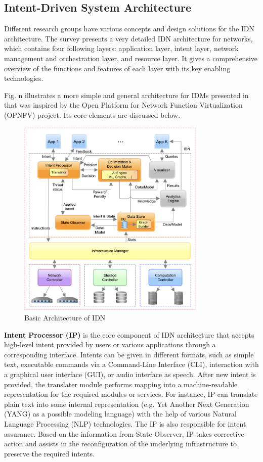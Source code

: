\subsection{Intent-Driven System Architecture}

Different research groups have various concepts and design solutions for the IDN architecture. The survey \cite[13]{Mehmood2021} presents a very detailed IDN architecture for networks, which contains four following layers: application layer, intent layer, network management and orchestration layer, and resource layer. It gives a comprehensive overview of the functions and features of each layer with its key enabling technologies.

Fig. n illustrates a more simple and general architecture for IDMs presented in \cite[3]{Saha2018} that was inspired by the Open Platform for Network Function Virtualization (OPNFV) project. Its core elements are discussed below.  

\begin{figure}[htb]
  \centering
  \includegraphics[width=0.8\textwidth]{figures/IBN_Architecture.png}
  \caption{Basic Architecture of IDN}
  \label{fig:IBN_Architecture}
\end{figure}

\textbf{Intent Processor (IP)} is the core component of IDN architecture that accepts high-level intent provided by users or various applications through a corresponding interface. Intents can be given in different formats, such as simple text, executable commands via a Command-Line Interface (CLI), interaction with a graphical user interface (GUI), or audio interface as speech. After new intent is provided, the translater module performs mapping into a machine-readable representation for the required modules or services. For instance, IP can translate plain text into some internal representation (e.g. Yet Another Next Generation (YANG) as a possible modeling language) with the help of various Natural Language Processing (NLP) technologies\cite[15]{Mehmood2021}. The IP is also responsible for intent assurance. Based on the information from State Observer, IP takes corrective action and assists in the reconfiguration of the underlying infrastructure to preserve the required intents.

